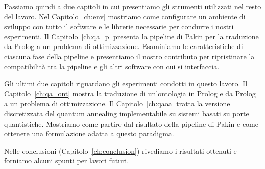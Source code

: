 Passiamo quindi a due capitoli in cui presentiamo gli strumenti utilizzati nel resto del lavoro. Nel Capitolo~\ref{ch:env} mostriamo come configurare un ambiente di sviluppo con tutto il software e le librerie necessarie per condurre i nostri esperimenti. Il Capitolo~\ref{ch:qa_p} presenta la pipeline di Pakin per la traduzione da Prolog a un problema di ottimizzazione. Esaminiamo le caratteristiche di ciascuna fase della pipeline e presentiamo il nostro contributo per ripristinare la compatibilità tra la pipeline e gli altri software con cui si interfaccia.

Gli ultimi due capitoli riguardano gli esperimenti condotti in questo lavoro. Il Capitolo~\ref{ch:qa_ont} mostra la traduzione di un'ontologia in Prolog e da Prolog a un problema di ottimizzazione. Il Capitolo~\ref{ch:qaoa} tratta la versione discretizzata del quantum annealing implementabile su sistemi basati su porte quantistiche. Mostriamo come partire dal risultato della pipeline di Pakin e come ottenere una formulazione adatta a questo paradigma.

Nelle conclusioni (Capitolo~\ref{ch:conclusion}) rivediamo i risultati ottenuti e forniamo alcuni spunti per lavori futuri.

\restoregeometry